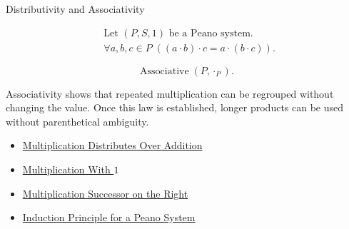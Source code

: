 \begin{topicbox}{Distributivity and Associativity}
\begin{remark*}
\[
\begin{aligned}
&\text{Let } (P,S,1) \text{ be a Peano system.}\\
&\forall a,b,c \in P\;((a \cdot b) \cdot c = a \cdot (b \cdot c)).
\end{aligned}
\]
\end{remark*}

\begin{remark*}
\[
\operatorname{Associative}(P,\cdot_P).
\]
\end{remark*}

\begin{remark*}[Interpretation]
Associativity shows that repeated multiplication can be regrouped without
changing the value. Once this law is established, longer products can be used
without parenthetical ambiguity.
\end{remark*}

\begin{dependencies}
\begin{itemize}
  \item \hyperref[thm:multiplication-distributes-over-addition]{Multiplication Distributes Over Addition}
  \item \hyperref[thm:multiplication-with-one]{Multiplication With $1$}
  \item \hyperref[thm:multiplication-successor-on-right]{Multiplication Successor on the Right}
  \item \hyperref[thm:induction-principle-for-peano-system]{Induction Principle for a Peano System}
\end{itemize}
\end{dependencies}
\end{topicbox}


